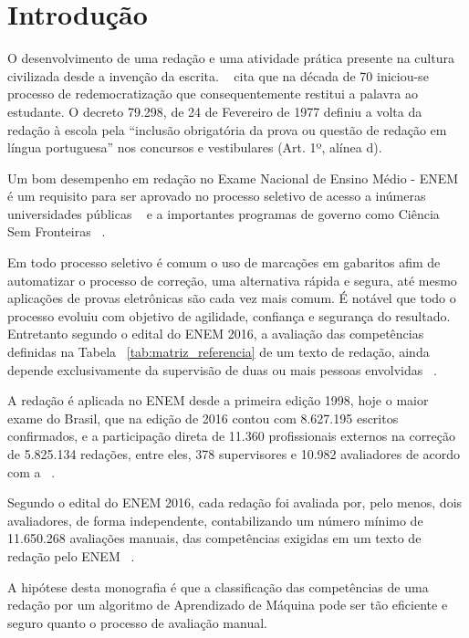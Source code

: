 \chapter{Introdução}\label{CAP:introducao}

\noindent O desenvolvimento de uma redação e uma atividade prática presente na cultura civilizada desde a invenção da escrita. ~\cite{lara:1995} cita que na década de 70 iniciou-se processo de redemocratização que consequentemente restitui a palavra ao estudante. O decreto 79.298, de 24 de Fevereiro de 1977 definiu a volta da redação à escola pela ``inclusão obrigatória da prova ou questão de redação em língua portuguesa'' nos concursos e vestibulares (Art. 1º, alínea d).

Um bom desempenho em redação no Exame Nacional de Ensino Médio - ENEM é um requisito para ser aprovado no processo seletivo de acesso a inúmeras universidades públicas ~\cite{sisu:2017} e a importantes programas de governo como Ciência Sem Fronteiras ~\cite{csf:2017}.

Em todo processo seletivo é comum o uso de marcações em gabaritos afim de automatizar o processo de correção, uma alternativa rápida e segura, até mesmo aplicações de provas eletrônicas são cada vez mais comum. É notável que todo o processo evoluiu com objetivo de agilidade, confiança e segurança do resultado. Entretanto segundo o edital do ENEM 2016, a avaliação das competências definidas na Tabela ~\ref{tab:matriz_referencia} de um texto de redação, ainda depende exclusivamente da supervisão de duas ou mais pessoas envolvidas ~\cite{edital_enem:2016}.

A redação é aplicada no ENEM desde a primeira edição 1998, hoje o maior exame do Brasil, que na edição de 2016 contou com 8.627.195 escritos confirmados, e a participação direta de 11.360 profissionais externos na correção de 5.825.134 redações, entre eles, 378 supervisores e 10.982 avaliadores de acordo com a ~\cite{relatorio_de_gestao:2016}. 

Segundo o edital do ENEM 2016, cada redação foi avaliada por, pelo menos, dois avaliadores, de forma independente, contabilizando um número mínimo de 11.650.268 avaliações manuais, das competências exigidas em um texto de redação pelo ENEM ~\cite{edital_enem:2016}.

A hipótese desta monografia é que a classificação das competências de uma redação por um algoritmo de Aprendizado de Máquina pode ser tão eficiente e seguro quanto o processo de avaliação manual.

